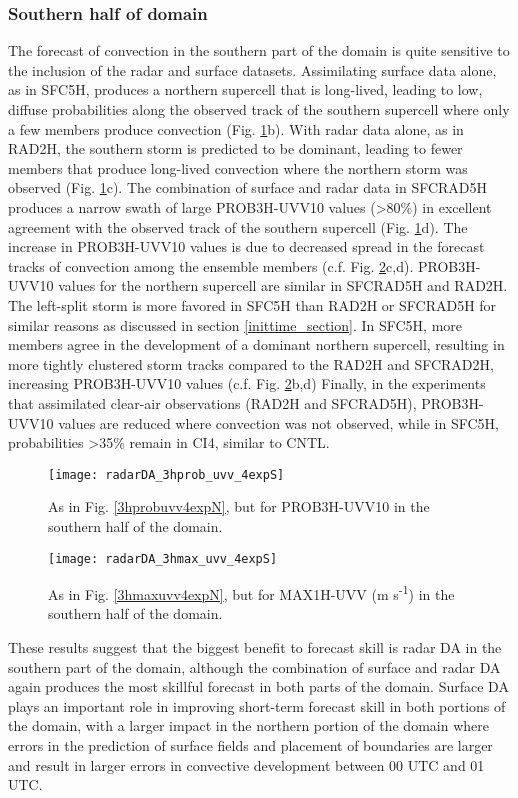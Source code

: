 \subsubsection{Southern half of domain}
The forecast of convection in the southern part of the domain is quite sensitive to the inclusion of the radar and surface datasets. Assimilating surface data alone, as in SFC5H, produces a northern supercell that is long-lived, leading to low, diffuse probabilities along the observed track of the southern supercell where only a few members produce convection (Fig. \ref{3hprobuvv4expS}b). With radar data alone, as in RAD2H, the southern storm is predicted to be dominant, leading to fewer members that produce long-lived convection where the northern storm was observed (Fig. \ref{3hprobuvv4expS}c). The combination of surface and radar data in SFCRAD5H produces a narrow swath of large PROB3H-UVV10 values (\textgreater 80\%) in excellent agreement with the observed track of the southern supercell (Fig. \ref{3hprobuvv4expS}d). The increase in PROB3H-UVV10 values is due to decreased spread in the forecast tracks of convection among the ensemble members (c.f. Fig. \ref{3hmaxuvv4expS}c,d). PROB3H-UVV10 values for the northern supercell are similar in SFCRAD5H and RAD2H. The left-split storm is more favored in SFC5H than RAD2H or SFCRAD5H for similar reasons as discussed in section \ref{inittime_section}. In SFC5H, more members agree in the development of a dominant northern supercell, resulting in more tightly clustered storm tracks compared to the RAD2H and SFCRAD2H, increasing PROB3H-UVV10 values (c.f. Fig. \ref{3hmaxuvv4expS}b,d) Finally, in the experiments that assimilated clear-air observations (RAD2H and SFCRAD5H), PROB3H-UVV10 values are reduced where convection was not observed, while in SFC5H, probabilities \textgreater 35\% remain in CI4, similar to CNTL.

\begin{figure}
\centering
\texttt{[image: radarDA\_3hprob\_uvv\_4expS]}
\caption{As in Fig. \ref{3hprobuvv4expN}, but for PROB3H-UVV10 in the southern half of the domain.}
\label{3hprobuvv4expS}
\end{figure}
\begin{figure}
\centering
\texttt{[image: radarDA\_3hmax\_uvv\_4expS]}
\caption{As in Fig. \ref{3hmaxuvv4expN}, but for MAX1H-UVV (m s\textsuperscript{-1}) in the southern half of the domain.}
\label{3hmaxuvv4expS}
\end{figure}

These results suggest that the biggest benefit to forecast skill is radar DA in the southern part of the domain, although the combination of surface and radar DA again produces the most skillful forecast in both parts of the domain. Surface DA plays an important role in improving short-term forecast skill in both portions of the domain, with a larger impact in the northern portion of the domain where errors in the prediction of surface fields and placement of boundaries are larger and result in larger errors in convective development between 00 UTC and 01 UTC.

